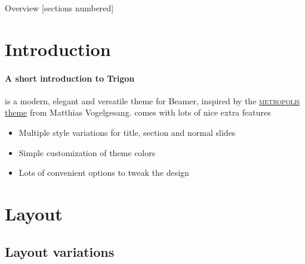 \titleframe

\begin{frame}{Overview}
  [sections numbered]
  \tableofcontents[hideallsubsections]
\end{frame}


\section{Introduction}
\begin{frame}{\insertsectionhead}
  \framesubtitle{A short introduction to Trigon}
  \themename is a modern, elegant and versatile theme for Beamer, inspired by
  the
  \href{https://github.com/matze/mtheme}{\textsc{metropolis} theme} from Matthias
  Vogelgesang.
  \vfill
  \themename comes with lots of nice extra features
  \begin{itemize}
    \item Multiple style variations for title, section and normal slides
    \item Simple customization of theme colors
    \item Lots of convenient options to tweak the design
  \end{itemize}
\end{frame}


\section{Layout}

\subsection{Layout variations}

